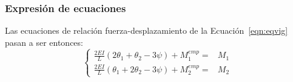 %
%
%
%
%
%
%
%
%
%
%
%

\subsubsection{Expresión de ecuaciones}

Las ecuaciones de relación fuerza-desplazamiento de la Ecuación~\eqref{eqn:eqvig} pasan a ser entonces:
\begin{equation}\label{eqn:ecmomtr}
\boxed{
\left\{
\begin{array}{rl}
\displaystyle
\frac{2 EI}{L} \left( 2 \theta_1  + \theta_2 - 3 \psi   \right) + M_1^{emp} =& M_1  \\[3mm]
\displaystyle
\frac{2 EI}{L} \left( \theta_1 + 2  \theta_2 - 3 \psi  \right) + M_2^{emp} =& M_2 
\end{array}
\right.
}
\end{equation}


